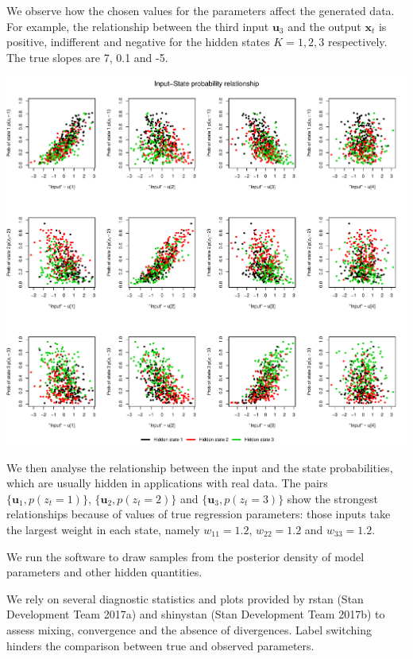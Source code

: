 \documentclass[]{article}
\newcommand{\mat}[1]{\mathbf{#1}}
\begin{document}
{{{We observe how the chosen values for the parameters affect the generated
data. For example, the relationship between the third input
\(\mat{u}_3\) and the output \(\mat{x}_t\) is positive, indifferent and
negative for the hidden states \(K = 1, 2, 3\) respectively. The true
slopes are 7, 0.1 and -5.

\includegraphics[width=\textwidth]{main_pdf_files/figure-latex/iohmm_walkthrough_inputprob-1}

We then analyse the relationship between the input and the state
probabilities, which are usually hidden in applications with real data.
The pairs \(\{ \mat{u}_1, p(z_t = 1) \}\),
\(\{ \mat{u}_2, p(z_t = 2) \}\) and \(\{ \mat{u}_3, p(z_t = 3) \}\) show
the strongest relationships because of values of true regression
parameters: those inputs take the largest weight in each state, namely
\(w_{11} = 1.2\), \(w_{22} = 1.2\) and \(w_{33} = 1.2\).

We run the software to draw samples from the posterior density of model
parameters and other hidden quantities.

We rely on several diagnostic statistics and plots provided by rstan
(Stan Development Team 2017a) and shinystan (Stan Development Team
2017b) to assess mixing, convergence and the absence of divergences.
Label switching hinders the comparison between true and observed
parameters.

}}}
\end{document}
